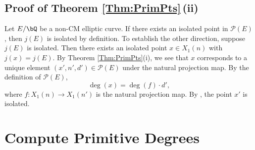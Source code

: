 \documentclass[11pt,reqno]{amsart}
\theoremstyle{plain}
\theoremstyle{definition}
\newcommand{\Q}{\bQ}
\newcommand{\Z}{\bZ}
\newcommand{\abbey}[1]{\textcolor{blue}{Abbey: #1}}
\newcommand{\sachi}[1]{\textcolor{purple}{Sachi: #1}}
\newcommand{\travis}[1]{\textcolor{orange}{Travis: #1}}
\begin{document}
\subsection{Proof of Theorem \ref{Thm:PrimPts}\,(ii)} Let $E/\Q$ be a non-CM elliptic curve. If there exists an isolated point in $\mathcal{P}(E)$, then $j(E)$ is isolated by definition. To establish the other direction, suppose $j(E)$ is isolated. Then there exists an isolated point $x \in X_1(n)$ with $j(x)=j(E)$. By Theorem \ref{Thm:PrimPts}(i), we see that $x$ corresponds to a unique element $(x',n',d') \in \mathcal{P}(E)$ under the natural projection map. By the definition of $\mathcal{P}(E)$,
\[
\deg(x)=\deg(f)\cdot d',
\]
where $f: X_1(n) \rightarrow X_1(n')$ is the natural projection map. By \cite[Theorem 4.3]{BELOV}, the point $x'$ is isolated.






\section{Compute Primitive Degrees}
\label{sec:primitivedeg}
\end{document}
